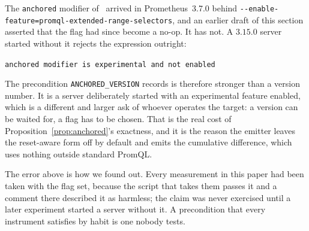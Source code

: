 \begin{remark}\label{rem:anchored-flag}
The \texttt{anchored} modifier of~\citet{prom0052} arrived in Prometheus~3.7.0 behind
\texttt{-{}-enable-feature=promql-extended-range-selectors}, and an earlier draft of this
section asserted that the flag had since become a no-op. It has not. A $3.15.0$ server
started without it rejects the expression outright:
\begin{center}\footnotesize
\texttt{anchored modifier is experimental and not enabled}
\end{center}
The precondition \texttt{ANCHORED\_VERSION} records is therefore stronger than a version
number. It is a server deliberately started with an experimental feature enabled, which
is a different and larger ask of whoever operates the target: a version can be waited
for, a flag has to be chosen. That is the real cost of
Proposition~\ref{prop:anchored}'s exactness, and it is the reason the emitter leaves the
reset-aware form off by default and emits the cumulative difference, which uses nothing
outside standard PromQL.

The error above is how we found out. Every measurement in this paper had been taken with
the flag set, because the script that takes them passes it and a comment there described
it as harmless; the claim was never exercised until a later experiment started a server
without it. A precondition that every instrument satisfies by habit is one nobody tests.
\end{remark}
